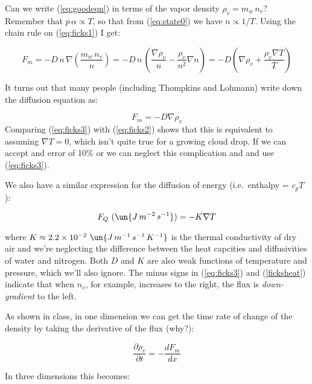\documentclass[12pt]{article}
\begin{document}
Can we write (\ref{eq:goodeqn}) in terms of the vapor density 
$\rho_v = m_w\,n_v$?
Remember that $p\,\alpha \propto T$, so that from (\ref{eq:state0})
we have $n \propto 1/T$.  Using the chain rule on (\ref{eq:ficks1})
I get:

\begin{equation}
  \label{eq:ficks2}
  F_m = -D\,n\, \nabla \left (\frac{m_w\,n_v}{n} \right ) =
 -D\,n\,\left ( \frac{\nabla \rho_v}{n} - \frac{\rho_v}{n^2} \nabla n \right )
= -D \left ( \nabla \rho_v + \frac{\rho_v \nabla T}{T} \right )
\end{equation}

It turns out that many people (including Thompkins and Lohmann) write down the diffusion
equation as:

\begin{equation}
  \label{eq:ficks3}
  F_m  = -D  \nabla \rho_v 
\end{equation}
Comparing (\ref{eq:ficks3}) with (\ref{eq:ficks2}) shows that
this is equivalent to assuming $\nabla T=0$, which isn't
quite true for a growing cloud drop.  If we can accept and error of 10\% or 
we can neglect this complication and 
and use (\ref{eq:ficks3}).


We also have a similar expression for the diffusion of energy
(i.e.~enthalpy = $c_p T$):

\begin{equation}
  \label{ficksheat}
  F_Q~(\un{J\,m^{-2}\,s^{-1}})= -K \nabla T
\end{equation}

\noindent 
where $K \approx 2.2 \times 10^{-2}~\un{J\,m^{-1}\,s^{-1}\,K^{-1}}$ is
the thermal conductivity of dry air and we're neglecting the
difference between the heat capcities and diffusivities of water and
nitrogen.  Both $D$ and $K$ are also weak functions of temperature and
pressure, which we'll also ignore.  The minus signs in
(\ref{eq:ficks3}) and (\ref{ficksheat}) indicate that when $n_v$, for
example, increases to the right, the flux is \emph{down-gradient} to
the left.

As shown in class, in one dimension we can get the time rate of change of the
density by taking the derivative of the flux (why?):

\begin{equation}
  \label{old}
  \frac{\partial \rho_v}{\partial t} = - \frac{ dF_m}{dx}
\end{equation}

\noindent
In three dimensions this becomes:
\end{document}
